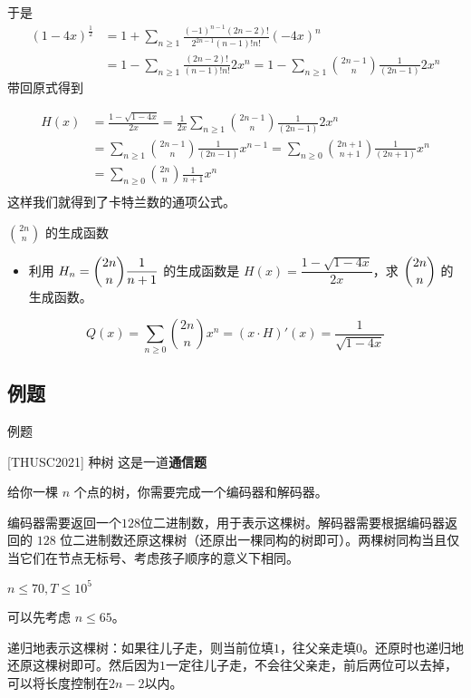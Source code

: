 \documentclass[UTF8]{beamer}
\begin{document}
\begin{frame}
于是
$$
\begin{aligned}
(1-4x)^{\frac{1}{2}}
&=1+\sum_{n\ge 1}\frac{(-1)^{n-1}(2n-2)!}{2^{2n-1}(n-1)!n!}(-4x)^n\\
&=1-\sum_{n\ge 1}\frac{(2n-2)!}{(n-1)!n!}2x^n
=1-\sum_{n\ge 1}\binom{2n-1}{n}\frac{1}{(2n-1)}2x^n
\end{aligned}
$$
带回原式得到

$$
\begin{aligned}
H(x)&=\frac{1- \sqrt{1-4x}}{2x}=\frac{1}{2x}\sum_{n\ge 1}\binom{2n-1}{n}\frac{1}{(2n-1)}2x^n\\
&=\sum_{n\ge 1}\binom{2n-1}{n}\frac{1}{(2n-1)}x^{n-1}=\sum_{n\ge 0}\binom{2n+1}{n+1}\frac{1}{(2n+1)}x^{n}\\
&=\sum_{n\ge 0}\binom{2n}{n}\frac{1}{n+1}x^{n}\\
\end{aligned}
$$
这样我们就得到了卡特兰数的通项公式。
\end{frame}

\begin{frame}{$\binom{2n}{n}$ 的生成函数}
    \begin{itemize}
        \item 
        利用 $H_n=\dbinom{2n}{n}\dfrac{1}{n+1}$ 的生成函数是 $H(x)=\dfrac{1- \sqrt{1-4x}}{2x}$，求 $\dbinom{2n}{n}$ 的生成函数。
    \end{itemize}
    \pause

    $$
    Q(x)=\sum_{n\ge 0} \binom{2n}{n}x^n=(x\cdot H)'(x) = \frac{1}{\sqrt{1-4x}}
    $$
\end{frame}

\subsection{例题}
\begin{frame}{例题}
    \begin{block}{[THUSC2021] 种树}
        这是一道\textbf{通信题}

给你一棵 $n$ 个点的树，你需要完成一个编码器和解码器。

编码器需要返回一个$128$位二进制数，用于表示这棵树。解码器需要根据编码器返回的 $128$ 位二进制数还原这棵树（还原出一棵同构的树即可）。两棵树同构当且仅当它们在节点无标号、考虑孩子顺序的意义下相同。



$n\le 70,T\le 10^5$
    \end{block}

    \pause

    可以先考虑 $n\le 65$。

    \pause

    递归地表示这棵树：如果往儿子走，则当前位填$1$，往父亲走填$0$。还原时也递归地还原这棵树即可。然后因为$1$一定往儿子走，不会往父亲走，前后两位可以去掉，可以将长度控制在$2n-2$以内。
\end{frame}
\end{document}
